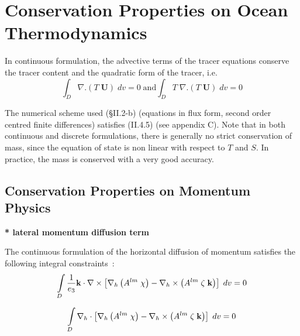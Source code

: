\section{Conservation Properties on Ocean Thermodynamics}
\label{Invariant_tra}

In continuous formulation, the advective terms of the tracer equations 
conserve the tracer content and the quadratic form of the tracer, i.e.
\begin{equation} \label{Eq_tra_tra2}
\int_D {\nabla .\left( {T\;{\textbf{U}}} \right)\;dv} =0
\;\text{and}
\int_D {T\;\nabla .\left( {T\;{\textbf{U}}} \right)\;dv} =0
\end{equation}

The numerical scheme used ({\S}II.2-b) (equations in flux form, second order 
centred finite differences) satisfies (II.4.5) (see appendix C). Note that 
in both continuous and discrete formulations, there is generally no strict 
conservation of mass, since the equation of state is non linear with respect 
to $T$ and $S$. In practice, the mass is conserved with a very good accuracy. 

\subsection{Conservation Properties on Momentum Physics}
\label{Invariant_dyn_physics}

\textbf{* lateral momentum diffusion term}

The continuous formulation of the horizontal diffusion of momentum satisfies 
the following integral constraints~:
\begin{equation} \label{Eq_dynldf_dyn}
\int\limits_D {\frac{1}{e_3 }{\rm {\bf k}}\cdot \nabla \times \left[ {\nabla 
_h \left( {A^{lm}\;\chi } \right)-\nabla _h \times \left( {A^{lm}\;\zeta 
\;{\rm {\bf k}}} \right)} \right]\;dv} =0
\end{equation}

\begin{equation} \label{Eq_dynldf_div}
\int\limits_D {\nabla _h \cdot \left[ {\nabla _h \left( {A^{lm}\;\chi } 
\right)-\nabla _h \times \left( {A^{lm}\;\zeta \;{\rm {\bf k}}} \right)} 
\right]\;dv} =0
\end{equation}

